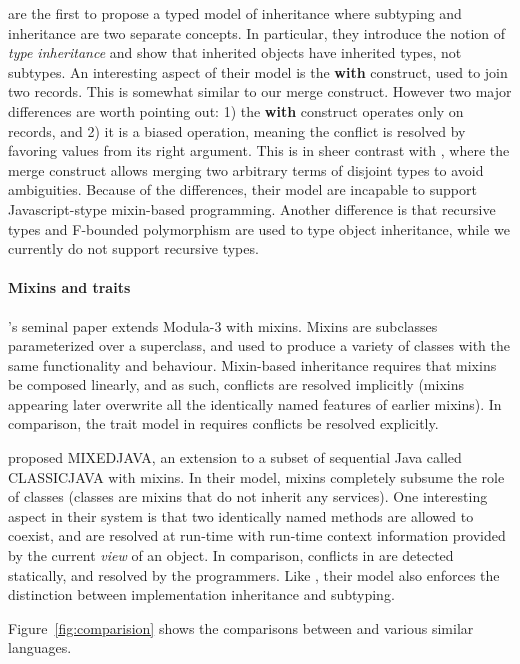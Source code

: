 \citet{cook1989inheritance} are the first to propose a typed model of
inheritance where subtyping and inheritance are two separate concepts. In
particular, they introduce the notion of \textit{type inheritance} and show that
inherited objects have inherited types, not subtypes. An interesting aspect of
their model is the \textbf{with} construct, used to join two records. This is
somewhat similar to our merge construct. However two major differences are worth
pointing out: 1) the \textbf{with} construct operates only on records, and 2) it
is a biased operation, meaning the conflict is resolved by favoring values from
its right argument. This is in sheer contrast with \name, where the merge
construct allows merging two arbitrary terms of disjoint types to avoid
ambiguities. Because of the differences, their model are incapable to support
Javascript-stype mixin-based programming. Another difference is that recursive
types and F-bounded polymorphism are used to type object inheritance, while we
currently do not support recursive types.

\paragraph{Mixins and traits} \citet{bracha1990mixin}'s seminal paper extends
Modula-3 with mixins. Mixins are subclasses parameterized over a superclass, and
used to produce a variety of classes with the same functionality and behaviour.
Mixin-based inheritance requires that mixins be composed linearly, and as such,
conflicts are resolved implicitly (mixins appearing later overwrite all the
identically named features of earlier mixins). In comparison, the trait model in
\name requires conflicts be resolved explicitly.

\citet{flatt1998classes} proposed MIXEDJAVA, an extension to a subset of
sequential Java called CLASSICJAVA with mixins. In their model, mixins
completely subsume the role of classes (classes are mixins that do not inherit
any services). One interesting aspect in their system is that two identically
named methods are allowed to coexist, and are resolved at run-time with run-time
context information provided by the current \textit{view} of an object. In
comparison, conflicts in \name are detected statically, and resolved by the
programmers. Like \name, their model also enforces the distinction between
implementation inheritance and subtyping.



Figure~\ref{fig:comparision} shows the comparisons between \name and various
similar languages.

